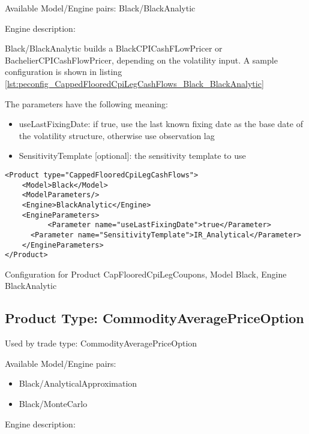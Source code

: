 Available Model/Engine pairs: Black/BlackAnalytic

Engine description:

Black/BlackAnalytic builds a BlackCPICashFLowPricer or BachelierCPICashFlowPricer, depending on the volatility input. A sample configuration is
shown in listing \ref{lst:peconfig_CappedFlooredCpiLegCashFlows_Black_BlackAnalytic}

The parameters have the following meaning:

\begin{itemize}
\item useLastFixingDate: if true, use the last known fixing date as the base date of the volatility structure, otherwise
  use observation lag        
\item SensitivityTemplate [optional]: the sensitivity template to use 
\end{itemize}

\begin{longlisting}
\begin{verbatim}
<Product type="CappedFlooredCpiLegCashFlows">
    <Model>Black</Model>
    <ModelParameters/>
    <Engine>BlackAnalytic</Engine>
    <EngineParameters>
          <Parameter name="useLastFixingDate">true</Parameter>
      <Parameter name="SensitivityTemplate">IR_Analytical</Parameter>
    </EngineParameters>
</Product>
\end{verbatim}
\caption{Configuration for Product CapFlooredCpiLegCoupons, Model Black, Engine BlackAnalytic}
\label{lst:peconfig_CappedFlooredCpiLegCashFlows_Black_BlackAnalytic}
\end{longlisting}

\subsection{Product Type: CommodityAveragePriceOption}

Used by trade type: CommodityAveragePriceOption

Available Model/Engine pairs:

\begin{itemize}
\item Black/AnalyticalApproximation
\item Black/MonteCarlo
\end{itemize}

Engine description:

